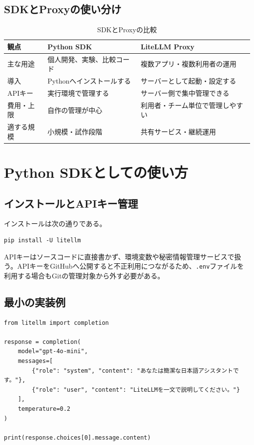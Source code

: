 \documentclass[a4paper,11pt]{jsarticle}
\begin{document}
\subsection{SDKとProxyの使い分け}

\begin{table}[tbp]
\centering
\caption{SDKとProxyの比較}
\begin{tabular}{p{35mm}p{57mm}p{57mm}}
\toprule
観点 & Python SDK & LiteLLM Proxy \\
\midrule
主な用途 & 個人開発、実験、比較コード & 複数アプリ・複数利用者の運用 \\
導入 & Pythonへインストールする & サーバーとして起動・設定する \\
APIキー & 実行環境で管理する & サーバー側で集中管理できる \\
費用・上限 & 自作の管理が中心 & 利用者・チーム単位で管理しやすい \\
適する規模 & 小規模・試作段階 & 共有サービス・継続運用 \\
\bottomrule
\end{tabular}
\end{table}

\section{Python SDKとしての使い方}

\subsection{インストールとAPIキー管理}

インストールは次の通りである。

\begin{verbatim}
pip install -U litellm
\end{verbatim}

APIキーはソースコードに直接書かず、環境変数や秘密情報管理サービスで扱う。APIキーをGitHubへ公開すると不正利用につながるため、\texttt{.env}ファイルを利用する場合もGitの管理対象から外す必要がある。

\subsection{最小の実装例}

\begin{lstlisting}[caption={LiteLLMでチャット生成を行う例}]
from litellm import completion

response = completion(
    model="gpt-4o-mini",
    messages=[
        {"role": "system", "content": "あなたは簡潔な日本語アシスタントです。"},
        {"role": "user", "content": "LiteLLMを一文で説明してください。"}
    ],
    temperature=0.2
)

print(response.choices[0].message.content)
\end{lstlisting}
\end{document}
